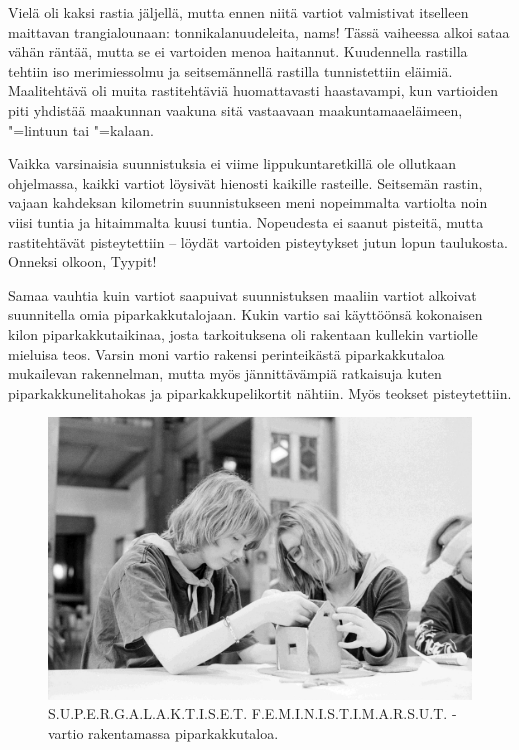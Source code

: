 \begin{multicols}{2}
Vielä oli kaksi rastia jäljellä, mutta ennen niitä vartiot valmistivat 
itselleen maittavan trangialounaan: tonnikalanuudeleita, nams! Tässä 
vaiheessa alkoi sataa vähän räntää, mutta se ei vartoiden menoa haitannut. 
Kuudennella rastilla tehtiin iso merimiessolmu ja seitsemännellä rastilla 
tunnistettiin eläimiä. Maalitehtävä oli muita rastitehtäviä huomattavasti 
haastavampi, kun vartioiden piti yhdistää maakunnan vaakuna sitä vastaavaan 
maakuntamaaeläimeen, "=lintuun tai "=kalaan. 

Vaikka varsinaisia suunnistuksia ei viime lippukuntaretkillä ole ollutkaan 
ohjelmassa, kaikki vartiot löysivät hienosti kaikille rasteille. Seitsemän 
rastin, vajaan kahdeksan kilometrin suunnistukseen meni nopeimmalta vartiolta 
noin viisi tuntia ja hitaimmalta kuusi tuntia. Nopeudesta ei saanut pisteitä, 
mutta rastitehtävät pisteytettiin -- löydät vartoiden pisteytykset 
jutun lopun taulukosta. Onneksi olkoon, Tyypit!

Samaa vauhtia kuin vartiot saapuivat suunnistuksen maaliin vartiot alkoivat 
suunnitella omia piparkakkutalojaan. Kukin vartio sai käyttöönsä kokonaisen 
kilon piparkakkutaikinaa, josta tarkoituksena oli rakentaan kullekin vartiolle 
mieluisa teos. Varsin moni vartio rakensi perinteikästä piparkakkutaloa 
mukailevan rakennelman, mutta myös jännittävämpiä ratkaisuja kuten 
piparkakkunelitahokas ja piparkakkupelikortit nähtiin. Myös teokset 
pisteytettiin.

\begin{figure}[!t]
\centering\includegraphics[width=\textwidth,trim={0 0 0 5cm},clip]{assets/meriharjuPipari}
\caption{S.U.P.E.R.G.A.L.A.K.T.I.S.E.T. F.E.M.I.N.I.S.T.I.M.A.R.S.U.T. -vartio rakentamassa piparkakkutaloa.}
\end{figure}


\end{multicols}
